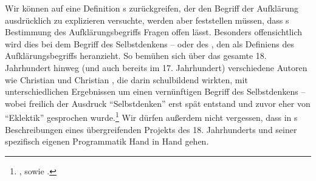 Wir können auf eine Definition s zurückgreifen, der den
Begriff der Aufklärung ausdrücklich zu explizieren versuchte, werden aber
feststellen müssen, dass s Bestimmung des
Aufklärungsbegriffs Fragen offen lässt. Besonders offensichtlich wird dies bei
dem Begriff des Selbstdenkens -- oder des , den  als Definiens des
Aufklärungsbegriffs heranzieht. So bemühen sich über das gesamte 18.
Jahrhundert hinweg (und auch bereits im 17. Jahrhundert) verschiedene Autoren
wie Christian  und Christian
, die darin schulbildend wirkten, mit
unterschiedlichen Ergebnissen um einen vernünftigen Begriff des Selbstdenkens --
wobei freilich der Ausdruck \enquote{Selbstdenken} erst spät entstand und zuvor
eher von \enquote{Eklektik} gesprochen
wurde.\footnote{\cite[Vgl.][92]{Albrecht:Thomasius--keinEklektiker?1989}, sowie
\cite[][241--243]{Albrecht:ChristianThomasius1999}.} Wir dürfen außerdem
nicht vergessen, dass in s  Beschreibungen eines übergreifenden Projekts des 18.
Jahrhunderts und seiner spezifisch eigenen Programmatik Hand in Hand gehen.

